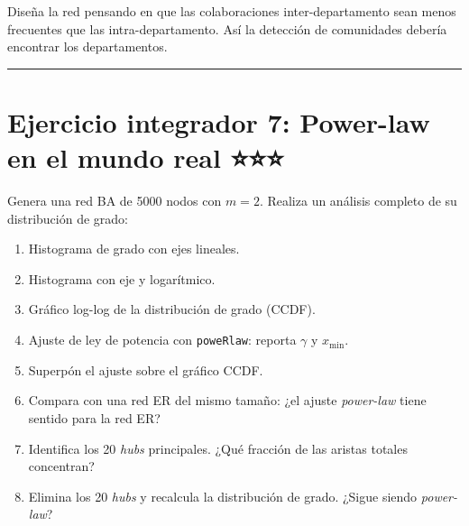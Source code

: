 \documentclass[
  letterpaper,
  DIV=11,
  numbers=noendperiod]{scrreprt}
\providecommand{\tightlist}{%
  \setlength{\itemsep}{0pt}\setlength{\parskip}{0pt}}
\begin{document}
\begin{tcolorbox}[enhanced jigsaw, toprule=.15mm, colframe=quarto-callout-note-color-frame, coltitle=black, titlerule=0mm, colback=white, breakable, leftrule=.75mm, arc=.35mm, bottomtitle=1mm, toptitle=1mm, rightrule=.15mm, bottomrule=.15mm, left=2mm, title=\textcolor{quarto-callout-note-color}{\faInfo}\hspace{0.5em}{💡 Pista 1}, colbacktitle=quarto-callout-note-color!10!white, opacityback=0, opacitybacktitle=0.6]

Diseña la red pensando en que las colaboraciones inter-departamento sean
menos frecuentes que las intra-departamento. Así la detección de
comunidades debería encontrar los departamentos.

\end{tcolorbox}

\begin{center}\rule{0.5\linewidth}{0.5pt}\end{center}

\section*{Ejercicio integrador 7: Power-law en el mundo real
⭐⭐⭐}\label{ejercicio-integrador-7-power-law-en-el-mundo-real}


Genera una red BA de 5000 nodos con \(m = 2\). Realiza un análisis
completo de su distribución de grado:

\begin{enumerate}
\def\labelenumi{\alph{enumi})}
\tightlist
\item
  Histograma de grado con ejes lineales.
\item
  Histograma con eje y logarítmico.
\item
  Gráfico log-log de la distribución de grado (CCDF).
\item
  Ajuste de ley de potencia con \texttt{poweRlaw}: reporta \(\gamma\) y
  \(x_{\min}\).
\item
  Superpón el ajuste sobre el gráfico CCDF.
\item
  Compara con una red ER del mismo tamaño: ¿el ajuste \emph{power-law}
  tiene sentido para la red ER?
\item
  Identifica los 20 \emph{hubs} principales. ¿Qué fracción de las
  aristas totales concentran?
\item
  Elimina los 20 \emph{hubs} y recalcula la distribución de grado.
  ¿Sigue siendo \emph{power-law}?
\end{enumerate}
\end{document}
